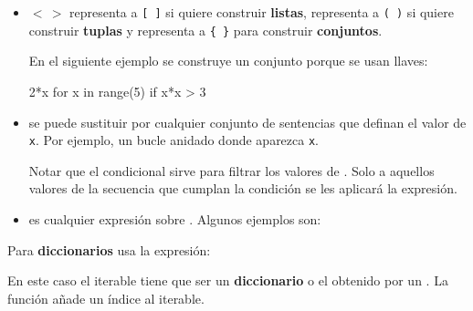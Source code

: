 \begin{itemize}
\item  $< \, >$ representa a \texttt{[ ]} si quiere construir \textbf{listas},
representa a \texttt{( )} si quiere construir \textbf{tuplas} y 
representa a \texttt{\{ \}} para construir \textbf{conjuntos}.

En el siguiente ejemplo se construye un conjunto porque se usan llaves: 


\hfil \begin{minipage}{.48\textwidth}
\begin{pyconsole}[][frame=single]
{2*x for x in range(5) if x*x > 3}
\end{pyconsole}
\end{minipage}


\item  \underline{} se puede sustituir por cualquier conjunto de sentencias que definan el valor de {\tt x}. Por ejemplo, un bucle anidado donde aparezca {\tt x}.
\begin{pyconsole}
\end{pyconsole}

Notar que el condicional sirve para filtrar los valores de . Solo a aquellos valores de la secuencia que cumplan la condición se les aplicará la  expresión.


\item \underline{} es cualquier expresión sobre . Algunos ejemplos son:
\end{itemize}



Para \textbf{diccionarios} usa la expresión:

\centerline{}
	
En este caso el iterable tiene que ser un \textbf{diccionario} o el obtenido por un .  La función   añade un índice al iterable.





